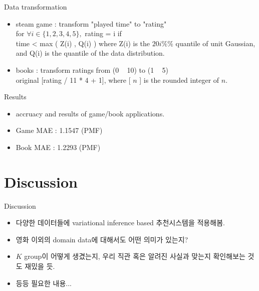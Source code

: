 \documentclass{beamer}
\begin{document}
\begin{frame}{Data transformation}
    \begin{itemize}
        \item steam game : transform "played time" to "rating" \\
	      for $\forall i \in \{1,2,3,4,5\},$ rating = i if \\
	      time < max ( Z(i) , Q(i) ) where Z(i) is the $20 i \%\%$ quantile of unit Gaussian, 
	      and Q(i) is the quantile of the data distribution.
	\item books : transform ratings from (0 ~ 10) to (1 ~ 5) \\
	      original [rating / 11 * 4 + 1], where [ $n$ ] is the rounded integer of $n$.
    \end{itemize}
\end{frame}

\begin{frame}{Results}
	\begin{itemize}
		\item accruacy and results of game/book applications.
		\item Game MAE : 1.1547 (PMF)
		\item Book MAE : 1.2293 (PMF)
	\end{itemize}
\end{frame}

\section{Discussion}
\begin{frame}{Discussion}
    \begin{itemize}
        \item 다양한 데이터들에 variational inference based 추천시스템을 적용해봄.
        \item 영화 이외의 domain data에 대해서도 어떤 의미가 있는지?
        \item $K$ group이 어떻게 생겼는지, 우리 직관 혹은 알려진 사실과 맞는지 확인해보는 것도 재밌을 듯.
        \item 등등 필요한 내용...
    \end{itemize}
\end{frame}
\end{document}
